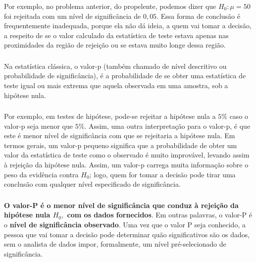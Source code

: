\documentclass[14pt,aspectratio=1610]{beamer}
\newcommand{\Ho}{\ensuremath{H_{0}}}
\begin{document}
\begin{frame}{}
\frametitle{}
\begin{block}{}
\justifying
Por exemplo, no problema anterior, do propelente, podemos dizer que $\Ho: \mu = 50$ foi rejeitada com um nível de significância de $0,05.$ Essa forma de conclusão é 
frequentemente inadequada, porque ela não dá ideia, a quem vai tomar a decisão, a respeito de se o valor calculado da estatística de teste estava apenas nas proximidades 
da região de rejeição ou se estava muito longe dessa região. 
\end{block}
\end{frame}

\begin{frame}{}
\frametitle{}
\begin{block}{}
\justifying
Na estatística clássica, o valor-p (também chamado de nível descritivo ou probabilidade de significância), é a probabilidade de se obter uma estatística de teste igual 
ou mais extrema que aquela observada em uma amostra, sob a hipótese nula.
\end{block}
\end{frame}

\begin{frame}{}
\frametitle{}
\begin{block}{}
\justifying
Por exemplo, em testes de hipótese, pode-se rejeitar a hipótese nula a $5\%$ caso o valor-p seja menor que $5\%.$ Assim, uma outra interpretação para o valor-p, é 
que este é menor nível de significância com que se rejeitaria a hipótese nula. Em termos gerais, um valor-p pequeno significa que a probabilidade de obter um valor da 
estatística de teste como o observado é muito improvável, levando assim à rejeição da hipótese nula. Assim, um valor-p carrega muita informação sobre o peso da 
evidência contra $\Ho$; logo, quem for tomar a decisão pode tirar uma conclusão com qualquer nível especificado de significância. 
\end{block}
\end{frame}

\begin{frame}{}
\frametitle{}
\begin{block}{}
\justifying
\textbf{O valor-P é o menor nível de significância que conduz à rejeição da hipótese nula $\Ho,$ com os dados fornecidos}. Em outras palavras, o valor-P é o 
\textbf{nível de significância observado}. Uma vez que o valor P seja conhecido, a pessoa que vai tomar a decisão pode determinar quão significativos são os dados, 
sem o analista de dados impor, formalmente, um nível pré-selecionado de significância.
\end{block}
\end{frame}
\end{document}
